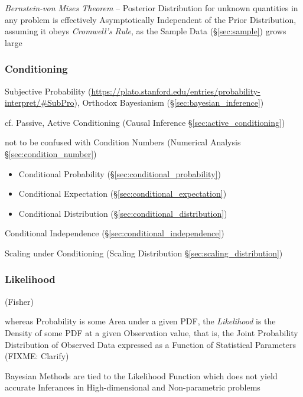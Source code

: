 \emph{Bernstein-von Mises Theorem} -- Posterior Distribution for unknown
quantities in any problem is effectively Asymptotically Independent of the Prior
Distribution, assuming it obeys \emph{Cromwell's Rule}, as the Sample Data
(\S\ref{sec:sample}) grows large



\subsubsection{Conditioning}\label{sec:conditioning}

Subjective Probability
(\url{https://plato.stanford.edu/entries/probability-interpret/#SubPro}),
Orthodox Bayesianism (\S\ref{sec:bayesian_inference})

\fist cf. Passive, Active Conditioning (Causal Inference
\S\ref{sec:active_conditioning})

\fist not to be confused with Condition Numbers (Numerical Analysis
\S\ref{sec:condition_number})

\begin{itemize}
  \item Conditional Probability (\S\ref{sec:conditional_probability})
  \item Conditional Expectation (\S\ref{sec:conditional_expectation})
  \item Conditional Distribution (\S\ref{sec:conditional_distribution})
\end{itemize}

\fist Conditional Independence (\S\ref{sec:conditional_independence})

\fist Scaling under Conditioning (Scaling Distribution
\S\ref{sec:scaling_distribution})



\subsubsection{Likelihood}\label{sec:likelihood}

(Fisher)

whereas Probability is some Area under a given PDF, the \emph{Likelihood} is the
Density of some PDF at a given Observation value, that is, the Joint Probability
Distribution of Observed Data expressed as a Function of Statistical Parameters
(FIXME: Clarify)

\fist Bayesian Methods are tied to the Likelihood Function which does not yield
accurate Inferances in High-dimensional and Non-parametric problems

